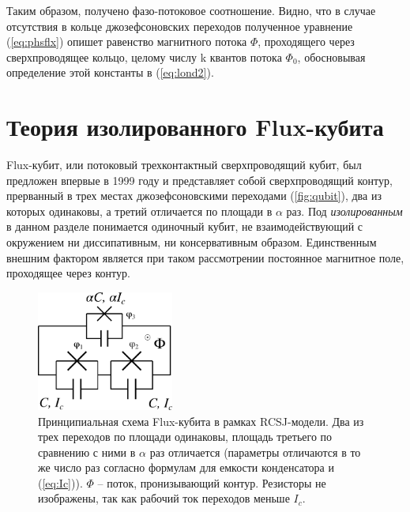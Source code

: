 \documentclass[12pt]{article}
\numberwithin{equation}{section}
\begin{document}
Таким образом, получено фазо-потоковое соотношение. Видно, что в случае отсутствия в кольце джозефсоновских переходов полученное уравнение (\ref{eq:phsflx}) опишет равенство магнитного потока $\Phi$, проходящего через сверхпроводящее кольцо, целому числу  k квантов потока $\Phi_0$, обосновывая определение этой константы в (\ref{eq:lond2}).


\section{Теория изолированного Flux-кубита}
Flux-кубит, или потоковый трехконтактный сверхпроводящий кубит, был предложен впервые в 1999 году\cite{Orlando1999} и представляет собой сверхпроводящий контур, прерванный в трех местах джозефсоновскими переходами (\autoref{fig:qubit}), два из которых одинаковы, а третий отличается по площади в $\alpha$ раз. Под \textit{изолированным} в данном разделе понимается одиночный кубит, не взаимодействующий с окружением ни диссипативным, ни консервативным образом. Единственным внешним фактором является при таком рассмотрении постоянное магнитное поле, проходящее через контур.

\begin{figure}
\centering
\includegraphics[width=0.4\textwidth]{Pictures/qubit}
\caption{Принципиальная схема Flux-кубита в рамках RCSJ-модели. Два из трех переходов по площади одинаковы, площадь третьего по сравнению с ними в $\alpha$ раз отличается (параметры отличаются в то же число раз согласно формулам для емкости конденсатора и (\ref{eq:Ic})). $\Phi$ -- поток, пронизывающий контур. Резисторы не изображены, так как рабочий ток переходов меньше $I_c$.}
\label{fig:qubit}
\end{figure}
\end{document}
